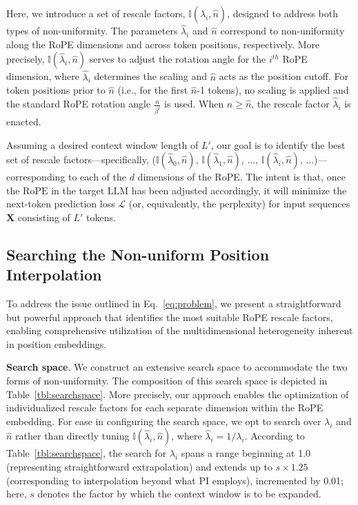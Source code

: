 Here, we introduce a set of rescale factors, $\mathbb{I}(\hat{\lambda}_{i},\hat{n})$, designed to address both types of non-uniformity. The parameters $\hat{\lambda}_{i}$ and $\hat{n}$ correspond to non-uniformity along the RoPE dimensions and across token positions, respectively. More precisely, $\mathbb{I}(\hat{\lambda}_{i},\hat{n})$ serves to adjust the rotation angle for the $i^{th}$ RoPE dimension, where $\hat\lambda_{i}$ determines the scaling and $\hat{n}$ acts as the position cutoff. For token positions prior to $\hat{n}$ (i.e., for the first $\hat{n}$-1 tokens), no scaling is applied and the standard RoPE rotation angle $\frac{n}{\beta^i}$ is used. When $n\ge\hat{n}$, the rescale factor $\hat\lambda_{i}$ is enacted.

Assuming a desired context window length of $L'$, our goal is to identify the best set of rescale factors—specifically, ($\mathbb{I}(\hat{\lambda}_{0},\hat{n})$, $\mathbb{I}(\hat{\lambda}_{1},\hat{n})$, ..., $\mathbb{I}(\hat{\lambda}_{i},\hat{n})$, ...)—corresponding to each of the $d$ dimensions of the RoPE. The intent is that, once the $\text{RoPE}$ in the target $\text{LLM}$ has been adjusted accordingly, it will minimize the next-token prediction loss $\mathcal{L}$ (or, equivalently, the perplexity) for input sequences $\mathbf{X}$ consisting of $L'$ tokens.

\subsection{Searching the Non-uniform Position Interpolation}

To address the issue outlined in Eq.~\ref{eq:problem}, we present a straightforward but powerful approach that identifies the most suitable RoPE rescale factors, enabling comprehensive utilization of the multidimensional heterogeneity inherent in position embeddings.

\textbf{Search space}. We construct an extensive search space to accommodate the two forms of non-uniformity. The composition of this search space is depicted in Table~\ref{tbl:searchspace}. More precisely, our approach enables the optimization of individualized rescale factors for each separate dimension within the RoPE embedding. For ease in configuring the search space, we opt to search over $\lambda_i$ and $\hat{n}$ rather than directly tuning $\mathbb{I}(\hat{\lambda}_{i},\hat{n})$, where $\hat{\lambda}_{i}=1/\lambda_i$. According to Table~\ref{tbl:searchspace}, the search for $\lambda_i$ spans a range beginning at 1.0 (representing straightforward extrapolation) and extends up to $s\times1.25$ (corresponding to interpolation beyond what PI employs), incremented by 0.01; here, $s$ denotes the factor by which the context window is to be expanded.

